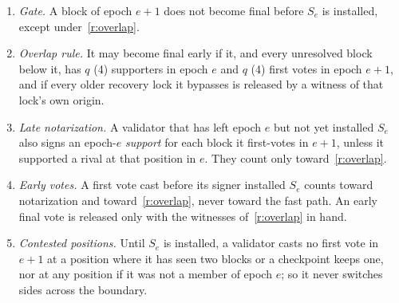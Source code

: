 \begin{enumerate}[resume,label=\rulename{R\arabic*},ref=R\arabic*]
\item\label{r:gate} \emph{Gate.} A block of epoch $e+1$ does not become final before $S_e$ is installed, except under~\ref{r:overlap}.
\item\label{r:overlap} \emph{Overlap rule.} It may become final early if it, and every unresolved block below it, has $q$ (4) supporters in epoch $e$ and $q$ (4) first votes in epoch $e+1$, and if every older recovery lock it bypasses is released by a witness of that lock's own origin.
\item\label{r:late} \emph{Late notarization.} A validator that has left epoch $e$ but not yet installed $S_e$ also signs an epoch-$e$ \emph{support} for each block it first-votes in $e+1$, unless it supported a rival at that position in $e$. They count only toward~\ref{r:overlap}.
\item\label{r:early} \emph{Early votes.} A first vote cast before its signer installed $S_e$ counts toward notarization and toward~\ref{r:overlap}, never toward the fast path. An early final vote is released only with the witnesses of~\ref{r:overlap} in hand.
\item\label{r:cross} \emph{Contested positions.} Until $S_e$ is installed, a validator casts no first vote in $e+1$ at a position where it has seen two blocks or a checkpoint keeps one, nor at any position if it was not a member of epoch $e$; so it never switches sides across the boundary.
\end{enumerate}
